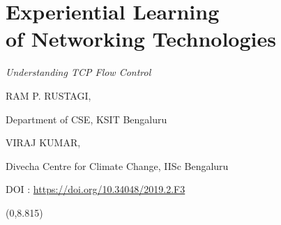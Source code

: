 \chapter{Experiential Learning\\ of Networking Technologies}
\vskip -15pt

\centerline{{\Huge\sl Understanding TCP Flow Control}}

\vskip 0.8cm

\begin{center}
{\large\uppercase{Ram P. Rustagi}}, 

\vskip -6pt

Department of CSE, KSIT Bengaluru 


\bigskip
{\large\uppercase{Viraj Kumar,}} 

\vskip -6pt

Divecha Centre for Climate Change, IISc Bengaluru

\end{center}

\vskip 2.3cm

\centerline{DOI : \url{https://doi.org/10.34048/2019.2.F3}}

\vfill


\begin{textblock}{16}(0,8.815)
\noindent{}
\end{textblock}
\newpage

